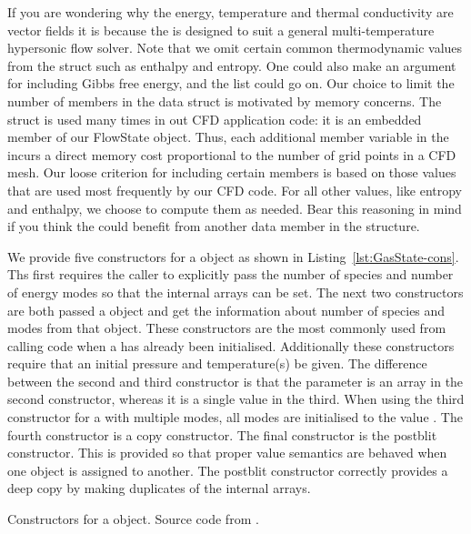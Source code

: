 If you are wondering why the energy, temperature and thermal conductivity are
vector fields it is because the  is designed to suit a 
general multi-temperature hypersonic flow solver.
Note that we omit certain common thermodynamic values from the  struct such as enthalpy and entropy.
One could also make an argument for including Gibbs free energy, and the list
could go on.
Our choice to limit the number of members in the data struct is motivated
by memory concerns.
The  struct is used many times in out CFD application code:
it is an embedded member of our FlowState object.
Thus, each additional member variable in the  incurs a direct
memory cost proportional to the number of grid points in a CFD mesh.
Our loose criterion for including certain members is based on those values
that are used most frequently by our CFD code.
For all other values, like entropy and enthalpy, we choose to compute them
as needed.
Bear this reasoning in mind if you think the  could benefit
from another data member in the structure.

We provide five constructors for a  object
as shown in Listing~\ref{lst:GasState-cons}.
Ths first requires the caller to explicitly pass
the number of species and number of energy modes so
that the internal arrays can be set.
The next two constructors are both passed a 
object and get the information about number of species
and modes from that object.
These constructors are the most commonly used from calling
code when a  has already been initialised.
Additionally these constructors require that an initial
pressure and temperature(s) be given.
The difference between the second and third constructor
is that the  parameter is an array in the
second constructor, whereas it is a single value in the third.
When using the third constructor for a  with multiple
modes, all modes are initialised to the value .
The fourth constructor is a copy constructor.
The final constructor is the postblit constructor.
This is provided so that proper value semantics are behaved 
when one  object is assigned to another.
The postblit constructor correctly provides a deep copy
by making duplicates of the internal arrays.

\begin{Listing}

\caption{Constructors for a  object. Source code from .}
\label{lst:GasState-cons}
\end{Listing}

